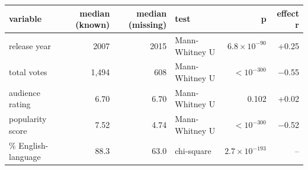 \begin{tabular}{lrrlrr}
\toprule
variable & median (known) & median (missing) & test & p & effect r \\
\midrule
release year & 2007 & 2015 & Mann-Whitney U & $6.8\times10^{-90}$ & +0.25 \\
total votes & 1{,}494 & 608 & Mann-Whitney U & $<10^{-300}$ & $-$0.55 \\
audience rating & 6.70 & 6.70 & Mann-Whitney U & 0.102 & +0.02 \\
popularity score & 7.52 & 4.74 & Mann-Whitney U & $<10^{-300}$ & $-$0.52 \\
\% English-language & 88.3 & 63.0 & chi-square & $2.7\times10^{-193}$ & -- \\
\bottomrule
\end{tabular}

